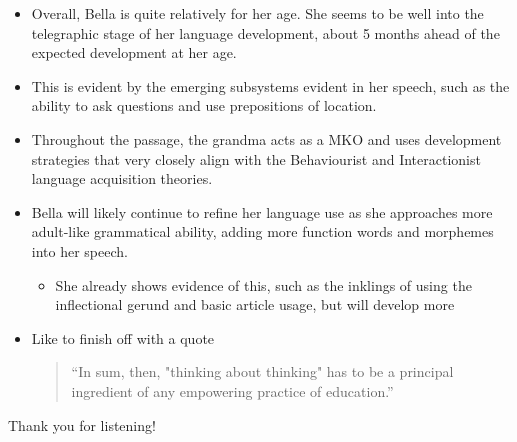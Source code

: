 \documentclass[
]{article}
\providecommand{\tightlist}{%
  \setlength{\itemsep}{0pt}\setlength{\parskip}{0pt}}
\begin{document}
\begin{itemize}
\item
  Overall, Bella is quite relatively for her age. She seems to be well
  into the telegraphic stage of her language development, about 5 months
  ahead of the expected development at her age.
\item
  This is evident by the emerging subsystems evident in her speech, such
  as the ability to ask questions and use prepositions of location.
\item
  Throughout the passage, the grandma acts as a MKO and uses development
  strategies that very closely align with the Behaviourist and
  Interactionist language acquisition theories.
\item
  Bella will likely continue to refine her language use as she
  approaches more adult-like grammatical ability, adding more function
  words and morphemes into her speech.

  \begin{itemize}
  \tightlist
  \item
    She already shows evidence of this, such as the inklings of using
    the inflectional gerund and basic article usage, but will develop
    more
  \end{itemize}
\item
  Like to finish off with a quote

  \begin{quote}
  ``In sum, then, "thinking about thinking" has to be a principal
  ingredient of any empowering practice of education.''
  \end{quote}
\end{itemize}

Thank you for listening!
\end{document}
